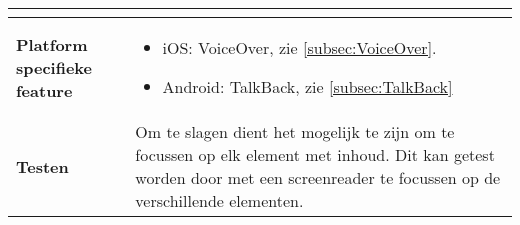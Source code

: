 \begin{table}[H]
\begin{tabular}{|l|p{12cm}|}
\begin{itemize}
        \end{itemize}                                                                                                                                                                                                                                                                                                                                                                                                                    \\ 
        \hline
        \textbf{Platform specifieke feature} & \begin{itemize}
            \item iOS: VoiceOver, zie \ref{subsec:VoiceOver}.
            \item Android: TalkBack, zie \ref{subsec:TalkBack}
        \end{itemize}                                                                                                                                                                       \\ 
        \hline
        \textbf{Testen}                       & Om te slagen dient het mogelijk te zijn om te focussen op elk element met inhoud. Dit kan getest worden door met een screenreader te focussen op de verschillende elementen.                                                                                                                                                                                          \\
        \hline
    \end{tabular}
    
\end{table}

